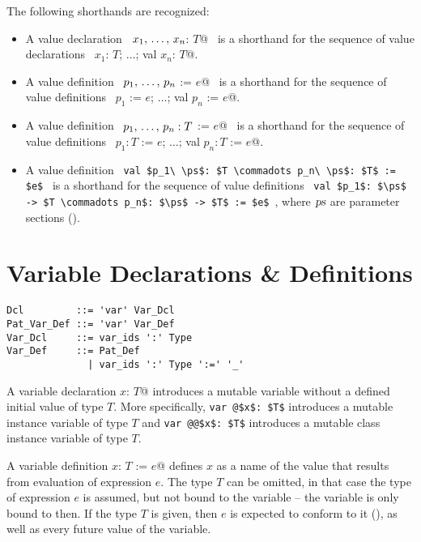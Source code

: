 The following shorthands are recognized: 
\begin{itemize}
\item[]
A value declaration ~\lstinline@val $x_1 ,\, \ldots ,\, x_n$: $T$@~ is a shorthand for the sequence of value declarations ~\lstinline@val $x_1$: $T$; $\ldots$; val $x_n$: $T$@. 

\item[]
A value definition ~\lstinline@val $p_1 ,\, \ldots ,\, p_n$ := $e$@~ is a shorthand for the sequence of value definitions ~\lstinline@val $p_1$ := $e$; $\ldots$; val $p_n$ := $e$@. 

\item[]
A value definition ~\lstinline@val $p_1 ,\, \ldots ,\, p_n: T$ := $e$@~ is a shorthand for the sequence of value definitions ~\lstinline@val $p_1: T$ := $e$; $\ldots$; val $p_n: T$ := $e$@.

\item[]
A value definition ~\lstinline!val $p_1\ \ps$: $T \commadots p_n\ \ps$: $T$ := $e$!~ is a shorthand for the sequence of value definitions ~\lstinline!val $p_1$: $\ps$ -> $T \commadots p_n$: $\ps$ -> $T$ := $e$!~, where $\mbox{\sl ps}$ are parameter sections ().
\end{itemize}






\section{Variable Declarations \& Definitions}
\label{sec:variable-dcl-def}

\syntax\begin{lstlisting}
Dcl         ::= 'var' Var_Dcl
Pat_Var_Def ::= 'var' Var_Def
Var_Dcl     ::= var_ids ':' Type
Var_Def     ::= Pat_Def
              | var_ids ':' Type ':=' '_'
\end{lstlisting}

A variable declaration \lstinline@var $x$: $T$@ introduces a mutable variable without a defined initial value of type $T$. More specifically, \lstinline+var @$x$: $T$+ introduces a mutable instance variable of type $T$ and \lstinline+var @@$x$: $T$+ introduces a mutable class instance variable of type $T$. 

A variable definition \lstinline@var $x$: $T$ := $e$@ defines $x$ as a name of the value that results from evaluation of expression $e$. The type $T$ can be omitted, in that case the type of expression $e$ is assumed, but not bound to the variable -- the variable is only bound to  then. If the type $T$ is given, then $e$ is expected to conform to it (), as well as every future value of the variable. 


